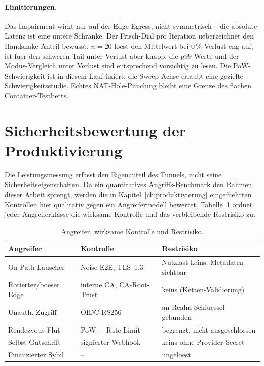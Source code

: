 \paragraph{Limitierungen.} Das Impairment wirkt nur auf der Edge-Egress, nicht
symmetrisch -- die absolute Latenz ist eine untere Schranke. Der Frisch-Dial pro
Iteration ueberzeichnet den Handshake-Anteil bewusst. $n=20$ loest den
Mittelwert bei 0\,\% Verlust eng auf, ist fuer den schweren Tail unter Verlust
aber knapp; die p99-Werte und der Modus-Vergleich unter Verlust sind entsprechend
vorsichtig zu lesen. Die PoW-Schwierigkeit ist in diesem Lauf fixiert; die
Sweep-Achse erlaubt eine gezielte Schwierigkeitsstudie. Echtes NAT-Hole-Punching
bleibt eine Grenze des flachen Container-Testbetts.

\section{Sicherheitsbewertung der Produktivierung}
\label{sec:eval-security}

Die Leistungsmessung erfasst den Eigenanteil des Tunnels, nicht seine
Sicherheitseigenschaften. Da ein quantitatives Angriffs-Benchmark den Rahmen
dieser Arbeit sprengt, werden die in Kapitel~\ref{ch:produktivierung}
eingefuehrten Kontrollen hier qualitativ gegen ein Angreifermodell bewertet.
Tabelle~\ref{tab:security-eval} ordnet jeder Angreiferklasse die wirksame
Kontrolle und das verbleibende Restrisiko zu.

\begin{table}[t]
  \centering
  \caption{Angreifer, wirksame Kontrolle und Restrisiko.}
  \label{tab:security-eval}
  \begin{tabular}{lll}
    \toprule
    Angreifer & Kontrolle & Restrisiko \\
    \midrule
    On-Path-Lauscher & Noise-E2E, TLS~1.3 & Nutzlast keins; Metadaten sichtbar \\
    Rotierter/boeser Edge & interne CA, CA-Root-Trust & keins (Ketten-Validierung) \\
    Unauth. Zugriff & OIDC-RS256 & an Realm-Schluessel gebunden \\
    Rendezvous-Flut & PoW + Rate-Limit & begrenzt, nicht ausgeschlossen \\
    Selbst-Gutschrift & signierter Webhook & keins ohne Provider-Secret \\
    Finanzierter Sybil & -- & ungeloest \\
    \bottomrule
  \end{tabular}
\end{table}

